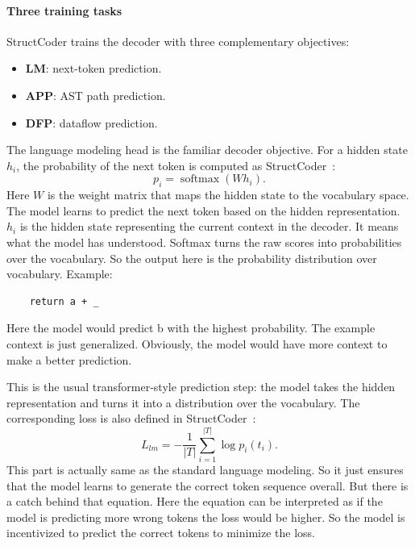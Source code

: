 \documentclass[12pt]{article}
\begin{document}
\paragraph{Three training tasks}
StructCoder trains the decoder with three complementary objectives:
\begin{itemize}
	\item \textbf{LM}: next-token prediction.
	\item \textbf{APP}: AST path prediction.
	\item \textbf{DFP}: dataflow prediction.
\end{itemize}

The language modeling head is the familiar decoder objective. For a hidden state $h_i$, the probability of the next token is computed as StructCoder~\cite{10.1145/3636430}:
\begin{equation}
p_i = \operatorname{softmax}(W h_i).
\end{equation}
Here $W$ is the weight matrix that maps the hidden state to the vocabulary space. The model learns to predict the next token based on the hidden representation. $h_i$ is the hidden state representing the current context in the decoder. It means what the model has understood. Softmax turns the raw scores into probabilities over the vocabulary. So the output here is the probability distribution over vocabulary. Example:
\begin{lstlisting}
	return a + _
\end{lstlisting}
Here the model would predict b with the highest probability. The example context is just generalized. Obviously, the model would have more context to make a better prediction.

This is the usual transformer-style prediction step: the model takes the hidden representation and turns it into a distribution over the vocabulary. The corresponding loss is also defined in StructCoder~\cite{10.1145/3636430}:
\begin{equation}
L_{lm} = -\frac{1}{|T|} \sum_{i=1}^{|T|} \log p_i(t_i).
\end{equation}
This part is actually same as the standard language modeling. So it just ensures that the model learns to generate the correct token sequence overall. But there is a catch behind that equation. Here the equation can be interpreted as if the model is predicting more wrong tokens the loss would be higher. So the model is incentivized to predict the correct tokens to minimize the loss.
\end{document}
